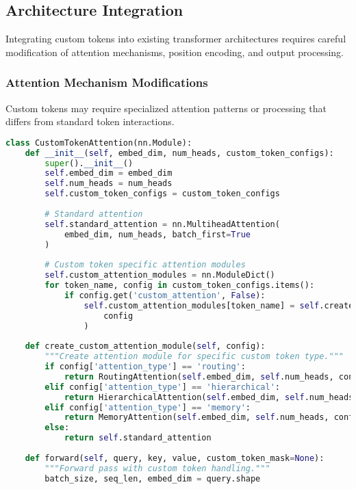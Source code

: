 \subsection{Architecture Integration}

Integrating custom tokens into existing transformer architectures requires careful modification of attention mechanisms, position encoding, and output processing.

\subsubsection{Attention Mechanism Modifications}

Custom tokens may require specialized attention patterns or processing that differs from standard token interactions.

\begin{lstlisting}[language=Python, caption=Custom attention mechanisms for special tokens]
class CustomTokenAttention(nn.Module):
    def __init__(self, embed_dim, num_heads, custom_token_configs):
        super().__init__()
        self.embed_dim = embed_dim
        self.num_heads = num_heads
        self.custom_token_configs = custom_token_configs
        
        # Standard attention
        self.standard_attention = nn.MultiheadAttention(
            embed_dim, num_heads, batch_first=True
        )
        
        # Custom token specific attention modules
        self.custom_attention_modules = nn.ModuleDict()
        for token_name, config in custom_token_configs.items():
            if config.get('custom_attention', False):
                self.custom_attention_modules[token_name] = self.create_custom_attention_module(
                    config
                )
    
    def create_custom_attention_module(self, config):
        """Create attention module for specific custom token type."""
        if config['attention_type'] == 'routing':
            return RoutingAttention(self.embed_dim, self.num_heads, config)
        elif config['attention_type'] == 'hierarchical':
            return HierarchicalAttention(self.embed_dim, self.num_heads, config)
        elif config['attention_type'] == 'memory':
            return MemoryAttention(self.embed_dim, self.num_heads, config)
        else:
            return self.standard_attention
    
    def forward(self, query, key, value, custom_token_mask=None):
        """Forward pass with custom token handling."""
        batch_size, seq_len, embed_dim = query.shape
        

\end{lstlisting}
